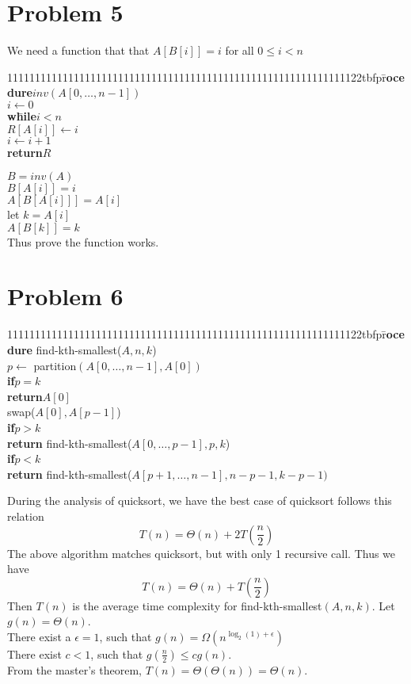 \documentclass[letter]{article}
\newcommand{\aprocedure}{\tex1111111111111111111111111111111111111111111111111111111111111122tbf{pr}\=\+\textbf{ocedure}\xspace}
\newcommand{\awhile}{\textbf{wh}\=\+\textbf{ile}\xspace}
\newcommand{\aif}{\textbf{if}\=\+\xspace}
\newcommand{\aend}{\-\kill}
\newcommand{\areturn}{\textbf{return}\xspace}
\begin{document}
\section*{Problem 5}

We need a function that that $A[B[i]] = i$ for all $0\leq i <n$
\begin{tabbing}
  \aprocedure $inv(A[0,\ldots,n-1])$ \\
  $i \gets 0$\\
  \awhile $i < n$\\
  $R[A[i]] \gets i$\\
  $i \gets i+1$\\
  \aend
  \areturn $R$
\end{tabbing}

$B = inv(A)$\\
$B[A[i]] = i$\\
$A[B[A[i]]] = A[i]$\\
let $k = A[i]$\\
$A[B[k]] = k$\\

Thus prove the function works.
\section*{Problem 6}
\begin{tabbing}
  \aprocedure find-kth-smallest($A,n,k$)\\
$p \gets$ partition$(A[0,\ldots,n-1],A[0])$\\
\aif $p = k$\\
\areturn $A[0]$\\
\aend
swap($A[0],A[p-1]$)\\
\aif $p > k$\\
\areturn find-kth-smallest($A[0,\ldots, p-1],p,k$)\\
\aend
\aif $p < k$\\
\areturn find-kth-smallest($A[p+1,\ldots, n-1],n-p-1,k-p-1)$\\
\end{tabbing}

During the analysis of quicksort, we have the best case of quicksort follows this relation\\
\[T(n) = \Theta(n) + 2T(\frac{n}{2})\]
The above algorithm matches quicksort, but with only 1 recursive call. Thus we have
\[T(n) = \Theta(n) + T(\frac{n}{2})\]
Then $T(n)$ is the average time complexity for find-kth-smallest$(A,n,k)$. 
Let $g(n) = \Theta(n)$. \\
There exist a $\epsilon = 1$, such that
$g(n) = \Omega(n^{\log_2(1) + \epsilon})$\\
There exist $c<1$, such that $g(\frac{n}{2}) \leq c g(n)$.\\
From the master's theorem, $T(n) = \Theta(\Theta(n)) = \Theta(n)$.
\end{document}
